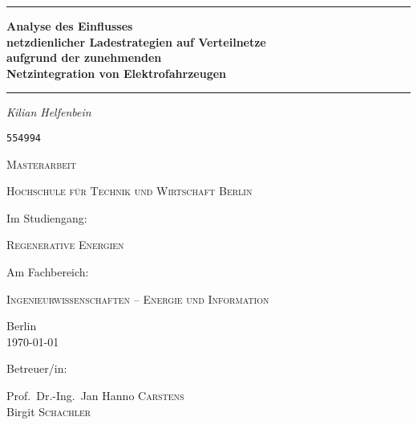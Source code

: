 
\begin{titlepage}
	\centering
	\par\noindent\rule{\textwidth}{0.4pt}
	{\huge\bfseries Analyse des Einflusses\\
	netzdienlicher Ladestrategien auf Verteilnetze\\
	aufgrund der zunehmenden\\
	Netzintegration von Elektrofahrzeugen\par}
	\par\noindent\rule{\textwidth}{0.4pt}\par
	\vspace*{2cm}
	{\Large\itshape Kilian Helfenbein\par}
	{\Large \texttt{554994}\par}
	\vspace{1.5cm}
	{\scshape\Large Masterarbeit\par}
	\vspace{1.5cm}
	{\scshape\LARGE Hochschule für Technik und Wirtschaft Berlin \par}
	\vspace{1cm}
	Im Studiengang:\par
	{\scshape\large Regenerative Energien\par}
	\vspace{.5cm}
	Am Fachbereich:\par
	{\scshape\large Ingenieurwissenschaften {--} Energie und Information\par}
	\vfill
	{\large Berlin\\
	\today\par}
	\vfill
	Betreuer/in:\par
	Prof.~Dr.-Ing.~Jan Hanno \textsc{Carstens}\\
	Birgit \textsc{Schachler}
\end{titlepage}